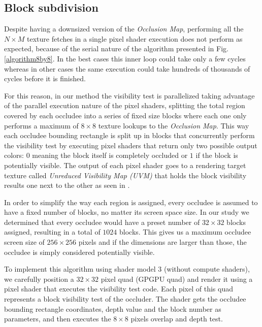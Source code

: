 \documentclass[10pt, conference]{IEEEtran}
\begin{document}
\subsection{Block subdivision}
%
Despite having a downsized version of the \emph{Occlusion Map}, performing all the $N \times M$ texture fetches in a single pixel shader execution 
does not perform as expected, because of the serial nature of the algorithm presented in Fig. \ref{algorithm8by8}. 
In the best cases this inner loop could take only a few cycles whereas in other cases the same execution could take hundreds of thousands of cycles before it is finished.\

For this reason, in our method the visibility test is parallelized taking advantage of the parallel execution nature of the pixel shaders, 
splitting the total region covered by each occludee into a series of fixed size blocks where each one only performs 
a maximum of $8 \times 8$ texture lookups to the \emph{Occlusion Map}. 
This way each occludee bounding rectangle is split up in blocks that concurrently perform the visibility test by executing pixel shaders that 
return only two possible output colors: $0$ meaning the block itself is completely occluded or $1$ if the block is potentially visible. 
The output of each pixel shader goes to a rendering target texture called \emph{Unreduced Visibility Map (UVM)} that holds 
the block visibility results one next to the other as seen in . 

In order to simplify the way each region is assigned, every occludee is assumed to have a fixed number of blocks, no matter its screen space size. 
In our study we determined that every occludee would have a preset number of $32 \times 32$ blocks assigned, resulting in a total of $1024$ blocks. 
This gives us a maximum occludee screen size of $256 \times 256$ pixels and if the dimensions are larger than those, the occludee is simply considered potentially visible.\

To implement this algorithm using shader model 3 (without compute shaders), we carefully position a $32 \times 32$ pixel quad (GPGPU quad) and render it using a pixel 
shader that executes the visibility test code. 
Each pixel of this quad represents a block visibility test of the occluder. 
The shader gets the occludee bounding rectangle coordinates, depth value and the block number as parameters, and then executes the $8 \times 8$ pixels 
overlap and depth test.\
\end{document}
